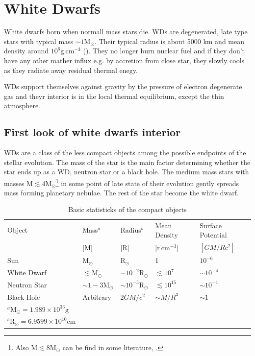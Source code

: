 \documentclass[oneside,a4paper,11pt]{report}
\begin{document}
\chapter{White Dwarfs}
White dwarfs born when normall mass stars die. WDs are degenerated, late type stars with typical mass $\sim 1 \mathrm{M_{\odot}}$. Their typical radius is about
 5000 km and mean density around $10^6 \mathrm{g\:cm^{-3}}$ (\citet{2004bhwd.book.....S}). They no longer burn nuclear fuel and
if they don't have any other mather influx e.g. by accretion from close star, they slowly cools as they radiate
away residual thermal enegy.

WDs support themselves against gravity by the pressure of electron degenerate gas and theyr interior is in the local thermal 
equilibrium, except the thin atmosphere.  

\section{First look of white dwarfs interior}
WDs are a class of the less compact objects among the possible endpoints of the stellar evolution. 
The mass of the star is the main factor determining whether the star ends up as a WD, neutron star or a black hole.
The medium mass stars with masses $\mathrm{M} \lesssim  4\mathrm{M_{\odot}}$\footnote{Also $\mathrm{M} \lesssim  8\mathrm{M_{\odot}}$ can be find in 
some literature, \citet{padm_vII}.} in some point of late state of their evolution gently spreads mass
 forming planetary nebulae. The rest of the star become the white dwarf.  

\begin{table}[hbt!]
\caption{Basic statisticks of the compact objects \citet{2004bhwd.book.....S}}
\centering
\begin{tabular}{lllll}
\hline
\hline
Object & Mass$^a$ & Radius$^b$ & Mean Density & Surface Potential  \\
       & $[\mathrm{M]}$ & $[\mathrm{R]}$ & $[\mathrm{r\:cm^{-3}]}$& $[GM/Rc^2]$                    \\
\hline
Sun         & $\mathrm{M_{\odot}}$            & $\mathrm{R_{\odot}}$             &1                  &$10^{-6}$ \\
White Dwarf & $\lesssim \mathrm{M_{\odot}}$   & $\sim 10^{-2}\mathrm{R_{\odot}}$ & $\lesssim 10^7$   &$\sim 10^{-4}$ \\
Neutron Star& $\sim1-3\mathrm{M_{\odot}}$     & $\sim 10^{-5}\mathrm{R_{\odot}}$ & $\lesssim 10^{15}$& $\sim 10^{-1}$\\
Black Hole  & Arbitrary              & $2GM/c^2$               & $\sim M/R^3$      & $\sim1$\\
\hline
\footnotesize
$^a \mathrm{M_{\odot}}=1.989 \times 10^{33} \mathrm{g}$ &&&& \\
\footnotesize
$^b \mathrm{R_{\odot}}=6.9599 \times 10^{10} \mathrm{cm}$ &&&& \\
\end{tabular}
\label{comobj1}
\end{table}
\end{document}
